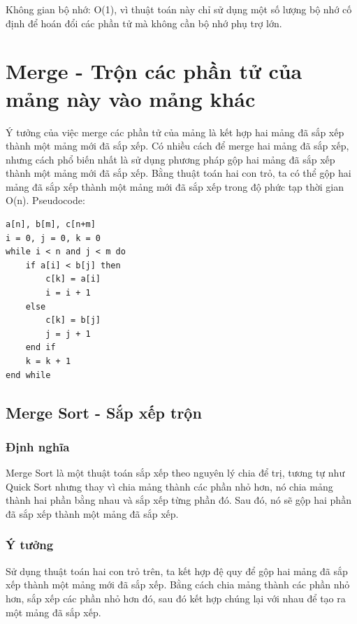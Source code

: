 \documentclass[12pt,a4paper]{report}
\begin{document}
{Không gian bộ nhớ: O(1), vì thuật toán này chỉ sử dụng một số lượng bộ nhớ cố định để hoán đổi các phần tử mà không cần bộ nhớ phụ trợ lớn.}

\chapter{ Merge - Trộn các phần tử của mảng này vào mảng khác}

Ý tưởng của việc merge các phần tử của mảng là kết hợp hai mảng đã sắp xếp thành một mảng mới đã sắp xếp. Có nhiều cách để merge hai mảng đã sắp xếp, nhưng cách phổ biến nhất là sử dụng phương pháp gộp hai mảng đã sắp xếp thành một mảng mới đã sắp xếp. Bằng thuật toán hai con trỏ, ta có thể gộp hai mảng đã sắp xếp thành một mảng mới đã sắp xếp trong độ phức tạp thời gian O(n). Pseudocode: 

\begin{lstlisting}
a[n], b[m], c[n+m]
i = 0, j = 0, k = 0
while i < n and j < m do
    if a[i] < b[j] then
        c[k] = a[i]
        i = i + 1
    else
        c[k] = b[j]
        j = j + 1
    end if
    k = k + 1
end while
\end{lstlisting}



\section{ Merge Sort - Sắp xếp trộn}
 
\subsection{ Định nghĩa}

{\large \hspace{1cm} Merge Sort là một thuật toán sắp xếp theo nguyên lý chia để trị, tương tự như Quick Sort nhưng thay vì chia mảng thành các phần nhỏ hơn, nó chia mảng thành hai phần bằng nhau và sắp xếp từng phần đó. Sau đó, nó sẽ gộp hai phần đã sắp xếp thành một mảng đã sắp xếp.}

\subsection { Ý tưởng}

Sử dụng thuật toán hai con trỏ trên, ta kết hợp đệ quy để gộp hai mảng đã sắp xếp thành một mảng mới đã sắp xếp. Bằng cách chia mảng thành các phần nhỏ hơn, sắp xếp các phần nhỏ hơn đó, sau đó kết hợp chúng lại với nhau để tạo ra một mảng đã sắp xếp.
\end{document}
